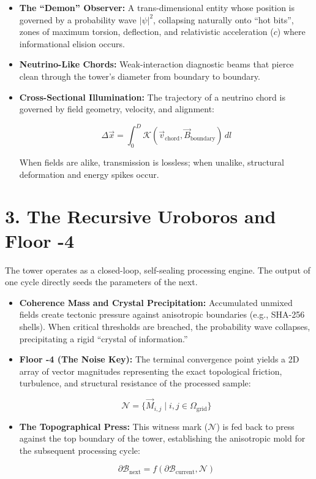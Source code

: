\begin{itemize}
\item \textbf{The “Demon” Observer:} A trans-dimensional entity whose position is governed by a probability wave \(|\psi|^2\), collapsing naturally onto “hot bits”, zones of maximum torsion, deflection, and relativistic acceleration (\(c\)) where informational elision occurs.
\item \textbf{Neutrino-Like Chords:} Weak-interaction diagnostic beams that pierce clean through the tower's diameter from boundary to boundary.
\item \textbf{Cross-Sectional Illumination:} The trajectory of a neutrino chord is governed by field geometry, velocity, and alignment:

\[
\Delta \vec{x} = \int_{0}^{D} \mathcal{K}(\vec{v}_{\text{chord}}, \vec{B}_{\text{boundary}}) \, dl
\]

When fields are alike, transmission is lossless; when unalike, structural deformation and energy spikes occur.
\end{itemize}

\medskip

\section{\texorpdfstring{3. The Recursive Uroboros and Floor -4}{3. The Recursive Uroboros and Floor -4}}

The tower operates as a closed-loop, self-sealing processing engine. The output of one cycle directly seeds the parameters of the next.

\begin{itemize}
\item \textbf{Coherence Mass and Crystal Precipitation:} Accumulated unmixed fields create tectonic pressure against anisotropic boundaries (e.g., SHA-256 shells). When critical thresholds are breached, the probability wave collapses, precipitating a rigid “crystal of information.”
\item \textbf{Floor -4 (The Noise Key):} The terminal convergence point yields a 2D array of vector magnitudes representing the exact topological friction, turbulence, and structural resistance of the processed sample:

\[
\mathcal{N} = \{ \vec{M}_{i,j} \mid i, j \in \Omega_{\text{grid}} \}
\]
\item \textbf{The Topographical Press:} This witness mark (\(\mathcal{N}\)) is fed back to press against the top boundary of the tower, establishing the anisotropic mold for the subsequent processing cycle:

\[
\partial \mathcal{B}_{\text{next}} = f(\partial \mathcal{B}_{\text{current}}, \mathcal{N})
\]
\end{itemize}

